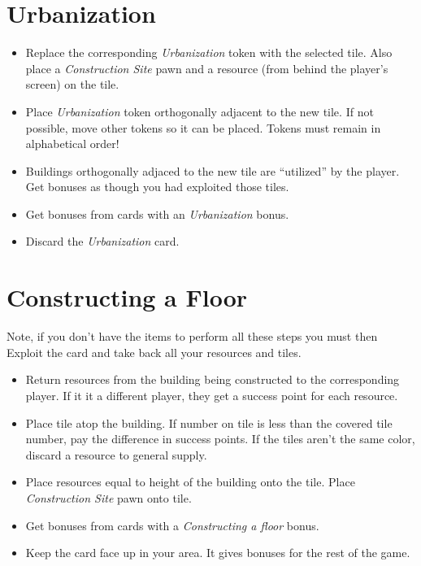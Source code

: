 \documentclass[12pt]{article}
\newenvironment{itemizeCustom}
{\begin{itemize}
  \setlength{\itemsep}{1pt}
  \setlength{\parskip}{0pt}
  \setlength{\parsep}{0pt}}
{\end{itemize}}
\begin{document}
\begin{multicols*}{2}
\section*{Urbanization}
\begin{itemizeCustom}
	\item Replace the corresponding \emph{Urbanization} token with the selected tile. Also place a \emph{Construction Site} pawn and a resource (from behind the player's screen) on the tile.
	\item Place \emph{Urbanization} token orthogonally adjacent to the new tile. If not possible, move other tokens so it can be placed. Tokens must remain in alphabetical order!
	\item Buildings orthogonally adjaced to the new tile are ``utilized'' by the player. Get bonuses as though you had exploited those tiles.
	\item Get bonuses from cards with an \emph{Urbanization} bonus.
	\item Discard the \emph{Urbanization} card.
\end{itemizeCustom}

\clearpage
\section*{Constructing a Floor}
Note, if you don't have the items to perform all these steps you must then Exploit the card and take back all your resources and tiles.
\begin{itemizeCustom}
	\item Return resources from the building being constructed to the corresponding player. If it it a different player, they get a success point for each resource.
	\item Place tile atop the building. If number on tile is less than the covered tile number, pay the difference in success points. If the tiles aren't the same color, discard a resource to general supply.
	\item Place resources equal to height of the building onto the tile. Place \emph{Construction Site} pawn onto tile.
	\item Get bonuses from cards with a \emph{Constructing a floor} bonus.
	\item Keep the card face up in your area. It gives bonuses for the rest of the game.
\end{itemizeCustom}


\end{multicols*}
\end{document}
